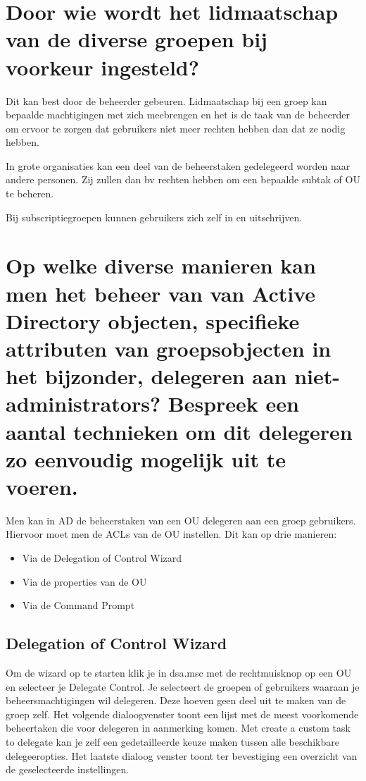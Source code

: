 \section{Door wie wordt het lidmaatschap van de diverse groepen bij voorkeur
ingesteld?}

Dit kan best door de beheerder gebeuren. Lidmaatschap bij een groep kan bepaalde
machtigingen met zich meebrengen en het is de taak van de beheerder om ervoor te
zorgen dat gebruikers niet meer rechten hebben dan dat ze nodig hebben.

In grote organisaties kan een deel van de beheerstaken gedelegeerd worden naar
andere personen. Zij zullen dan bv rechten hebben om een bepaalde subtak of OU
te beheren.

Bij subscriptiegroepen kunnen gebruikers zich zelf in en uitschrijven.

\section{Op welke diverse manieren kan men het beheer van van Active Directory
objecten, specifieke attributen van groepsobjecten in het bijzonder, delegeren
aan niet-administrators? Bespreek een aantal technieken om dit delegeren zo
eenvoudig mogelijk uit te voeren.}

Men kan in AD de beheerstaken van een OU delegeren aan een groep gebruikers.
Hiervoor moet men de ACLs van de OU instellen. Dit kan op drie manieren:
\begin{itemize}
	\item Via de Delegation of Control Wizard
	\item Via de properties van de OU
	\item Via de Command Prompt
\end{itemize}

\subsection{Delegation of Control Wizard}

Om de wizard op te starten klik je in dsa.msc met de rechtmuisknop op een OU en
selecteer je Delegate Control. Je selecteert de groepen of gebruikers waaraan je
beheersmachtigingen wil delegeren. Deze hoeven geen deel uit te maken van de
groep zelf. Het volgende dialoogvenster toont een lijst met de meest voorkomende
beheertaken die voor delegeren in aanmerking komen. Met create a custom task to
delegate kan je zelf een gedetailleerde keuze maken tussen alle beschikbare
delegeeropties. Het laatste dialoog venster toont ter bevestiging een overzicht
van de geselecteerde instellingen.

